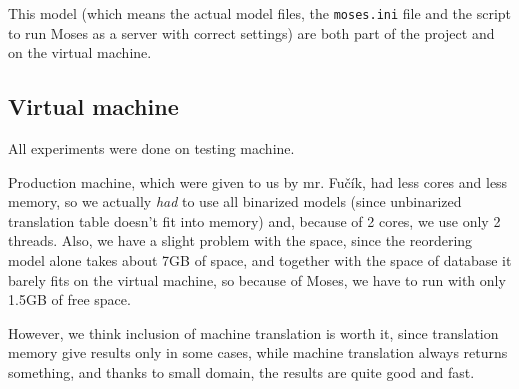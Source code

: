 This model (which means the actual model files, the \texttt{moses.ini} file and the script to run Moses as a server with correct settings) are both part of the project and on the virtual machine.

\subsection{Virtual machine}
All experiments were done on testing machine.

Production machine, which were given to us by mr. Fučík, had less cores and less memory, so we actually \emph{had} to use all binarized models (since unbinarized translation table doesn't fit into memory) and, because of 2 cores, we use only 2 threads. Also, we have a slight problem with the space, since the reordering model alone takes about 7GB of space, and together with the space of database it barely fits on the virtual machine, so because of Moses, we have to run with only 1.5GB of free space.

However, we think inclusion of machine translation is worth it, since translation memory give results only in some cases, while machine translation always returns something, and thanks to small domain, the results are quite good and fast.